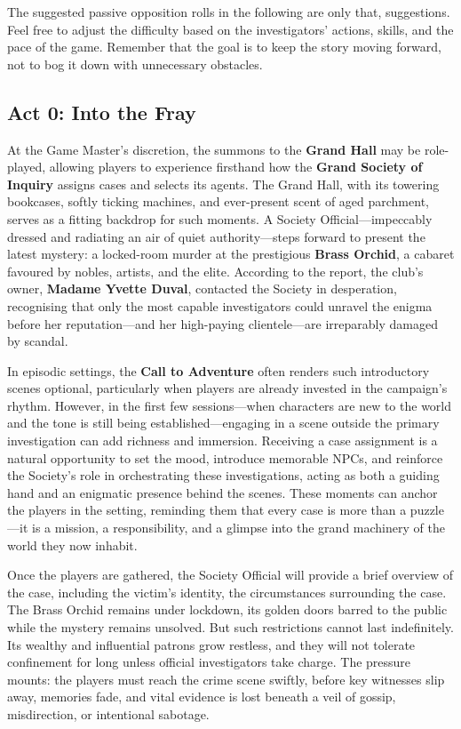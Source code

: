 \begin{GmTips}
	The suggested passive opposition rolls in the following are only that, suggestions. Feel free to adjust the difficulty based on the investigators' actions, skills, and the pace of the game. Remember that the goal is to keep the story moving forward, not to bog it down with unnecessary obstacles.
\end{GmTips}
\newcolumn


\subsection{Act 0: Into the Fray}

At the Game Master’s discretion, the summons to the \textbf{Grand Hall} may be role-played, allowing players to experience firsthand how the \textbf{Grand Society of Inquiry} assigns cases and selects its agents. The Grand Hall, with its towering bookcases, softly ticking machines, and ever-present scent of aged parchment, serves as a fitting backdrop for such moments. A Society Official—impeccably dressed and radiating an air of quiet authority—steps forward to present the latest mystery: a locked-room murder at the prestigious \textbf{Brass Orchid}, a cabaret favoured by nobles, artists, and the elite. According to the report, the club’s owner, \textbf{Madame Yvette Duval}, contacted the Society in desperation, recognising that only the most capable investigators could unravel the enigma before her reputation—and her high-paying clientele—are irreparably damaged by scandal.

In episodic settings, the \textbf{Call to Adventure} often renders such introductory scenes optional, particularly when players are already invested in the campaign’s rhythm. However, in the first few sessions—when characters are new to the world and the tone is still being established—engaging in a scene outside the primary investigation can add richness and immersion. Receiving a case assignment is a natural opportunity to set the mood, introduce memorable NPCs, and reinforce the Society’s role in orchestrating these investigations, acting as both a guiding hand and an enigmatic presence behind the scenes. These moments can anchor the players in the setting, reminding them that every case is more than a puzzle—it is a mission, a responsibility, and a glimpse into the grand machinery of the world they now inhabit.

Once the players are gathered, the Society Official will provide a brief overview of the case, including the victim's identity, the circumstances surrounding the case. The Brass Orchid remains under lockdown, its golden doors barred to the public while the mystery remains unsolved. But such restrictions cannot last indefinitely. Its wealthy and influential patrons grow restless, and they will not tolerate confinement for long unless official investigators take charge. The pressure mounts: the players must reach the crime scene swiftly, before key witnesses slip away, memories fade, and vital evidence is lost beneath a veil of gossip, misdirection, or intentional sabotage.


